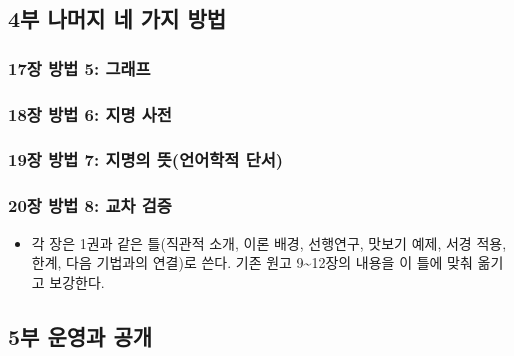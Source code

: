\hypertarget{uxbd80-uxb098uxba38uxc9c0-uxb124-uxac00uxc9c0-uxbc29uxbc95}{%
\subsection{4부 나머지 네 가지 방법}\label{uxbd80-uxb098uxba38uxc9c0-uxb124-uxac00uxc9c0-uxbc29uxbc95}}

\hypertarget{uxc7a5-uxbc29uxbc95-5-uxadf8uxb798uxd504}{%
\subsubsection{17장 방법 5: 그래프}\label{uxc7a5-uxbc29uxbc95-5-uxadf8uxb798uxd504}}

\hypertarget{uxc7a5-uxbc29uxbc95-6-uxc9c0uxba85-uxc0acuxc804}{%
\subsubsection{18장 방법 6: 지명 사전}\label{uxc7a5-uxbc29uxbc95-6-uxc9c0uxba85-uxc0acuxc804}}

\hypertarget{uxc7a5-uxbc29uxbc95-7-uxc9c0uxba85uxc758-uxb73buxc5b8uxc5b4uxd559uxc801-uxb2e8uxc11c}{%
\subsubsection{19장 방법 7: 지명의 뜻(언어학적 단서)}\label{uxc7a5-uxbc29uxbc95-7-uxc9c0uxba85uxc758-uxb73buxc5b8uxc5b4uxd559uxc801-uxb2e8uxc11c}}

\hypertarget{uxc7a5-uxbc29uxbc95-8-uxad50uxcc28-uxac80uxc99d}{%
\subsubsection{20장 방법 8: 교차 검증}\label{uxc7a5-uxbc29uxbc95-8-uxad50uxcc28-uxac80uxc99d}}

\begin{itemize}
\tightlist
\item
  각 장은 1권과 같은 틀(직관적 소개, 이론 배경, 선행연구, 맛보기 예제, 서경 적용, 한계, 다음 기법과의 연결)로 쓴다. 기존 원고 9\textasciitilde12장의 내용을 이 틀에 맞춰 옮기고 보강한다.
\end{itemize}

\hypertarget{uxbd80-uxc6b4uxc601uxacfc-uxacf5uxac1c}{%
\subsection{5부 운영과 공개}\label{uxbd80-uxc6b4uxc601uxacfc-uxacf5uxac1c}}

